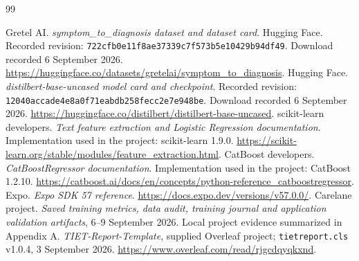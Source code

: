 \documentclass{tietreport}
\begin{document}
\begin{thebibliography}{99}
 Gretel AI. \emph{symptom\_to\_diagnosis dataset and dataset card}. Hugging Face. Recorded revision: \texttt{722cfb0e11f8ae37339c7f573b5e10429b94df49}. Download recorded 6 September 2026. \url{https://huggingface.co/datasets/gretelai/symptom_to_diagnosis}.
 Hugging Face. \emph{distilbert-base-uncased model card and checkpoint}. Recorded revision: \texttt{12040accade4e8a0f71eabdb258fecc2e7e948be}. Download recorded 6 September 2026. \url{https://huggingface.co/distilbert/distilbert-base-uncased}.
 scikit-learn developers. \emph{Text feature extraction and Logistic Regression documentation}. Implementation used in the project: scikit-learn 1.9.0. \url{https://scikit-learn.org/stable/modules/feature_extraction.html}.
 CatBoost developers. \emph{CatBoostRegressor documentation}. Implementation used in the project: CatBoost 1.2.10. \url{https://catboost.ai/docs/en/concepts/python-reference_catboostregressor}.
 Expo. \emph{Expo SDK 57 reference}. \url{https://docs.expo.dev/versions/v57.0.0/}.
 Carelane project. \emph{Saved training metrics, data audit, training journal and application validation artifacts}, 6--9 September 2026. Local project evidence summarized in Appendix A.
 \emph{TIET-Report-Template}, supplied Overleaf project; \texttt{tietreport.cls} v1.0.4, 3 September 2026. \url{https://www.overleaf.com/read/rjgcdqyqkxnd}.
\end{thebibliography}
\end{document}
